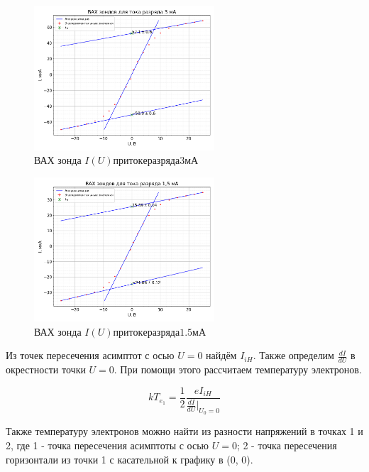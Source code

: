 \documentclass[a4paper, 12pt]{article}
\begin{document}
            \begin{figure}[!ht]
                \centering
                \includegraphics[width=0.6\textwidth]{img/vah_zond_3ma.png}
                \caption{ВАХ зонда $I(U) при токе разряда 3 мА$}
                \label{plot:vah_zond_3ma}
            \end{figure}

            \begin{figure}[!ht]
                \centering
                \includegraphics[width=0.6\textwidth]{img/vah_zond_15ma.png}
                \caption{ВАХ зонда $I(U) при токе разряда 1.5 мА$}
                \label{plot:vah_zond_15ma}
            \end{figure}

            Из точек пересечения асимптот с осью $U = 0$ найдём $I_{iH}$. Также определим $\frac{dI}{dU}$ в окрестности точки $U = 0$. При помощи этого рассчитаем температуру электронов.

            $$
                kT_{e_1} = \frac{1}{2} \frac{e I_{iH}}{\frac{dI}{dU} \vert_{U_0=0}}
            $$

            Также температуру электронов можно найти из разности напряжений в точках 1 и 2, где 1 - точка пересечения асимптоты с осью $U = 0$; 2 - точка пересечения горизонтали из точки 1 с касательной к графику в (0, 0).
\end{document}
